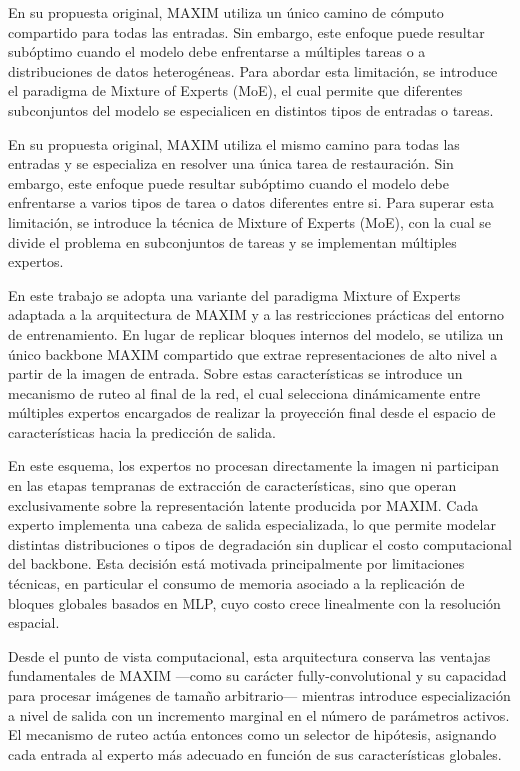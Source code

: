 \documentclass[aps,prl,twocolumn,groupedaddress]{revtex4-2}
\begin{document}
En su propuesta original, MAXIM utiliza un único camino de cómputo compartido para todas las entradas. Sin embargo, este enfoque puede resultar subóptimo cuando el modelo debe enfrentarse a múltiples tareas o a distribuciones de datos heterogéneas. Para abordar esta limitación, se introduce el paradigma de Mixture of Experts (MoE), el cual permite que diferentes subconjuntos del modelo se especialicen en distintos tipos de entradas o tareas.

En su propuesta original, MAXIM utiliza el mismo camino para todas las entradas y se especializa en resolver una única tarea de restauración. Sin embargo, este enfoque puede resultar subóptimo cuando el modelo debe enfrentarse a varios tipos de tarea o datos diferentes entre si. Para superar esta limitación, se introduce la técnica de Mixture of Experts (MoE), con la cual se divide el problema en subconjuntos de tareas y se implementan múltiples expertos.

En este trabajo se adopta una variante del paradigma Mixture of Experts adaptada a la arquitectura de MAXIM y a las restricciones prácticas del entorno de entrenamiento. En lugar de replicar bloques internos del modelo, se utiliza un único backbone MAXIM compartido que extrae representaciones de alto nivel a partir de la imagen de entrada. Sobre estas características se introduce un mecanismo de ruteo al final de la red, el cual selecciona dinámicamente entre múltiples expertos encargados de realizar la proyección final desde el espacio de características hacia la predicción de salida.

En este esquema, los expertos no procesan directamente la imagen ni participan en las etapas tempranas de extracción de características, sino que operan exclusivamente sobre la representación latente producida por MAXIM. Cada experto implementa una cabeza de salida especializada, lo que permite modelar distintas distribuciones o tipos de degradación sin duplicar el costo computacional del backbone. Esta decisión está motivada principalmente por limitaciones técnicas, en particular el consumo de memoria asociado a la replicación de bloques globales basados en MLP, cuyo costo crece linealmente con la resolución espacial.

Desde el punto de vista computacional, esta arquitectura conserva las ventajas fundamentales de MAXIM —como su carácter fully-convolutional y su capacidad para procesar imágenes de tamaño arbitrario— mientras introduce especialización a nivel de salida con un incremento marginal en el número de parámetros activos. El mecanismo de ruteo actúa entonces como un selector de hipótesis, asignando cada entrada al experto más adecuado en función de sus características globales.
\end{document}
